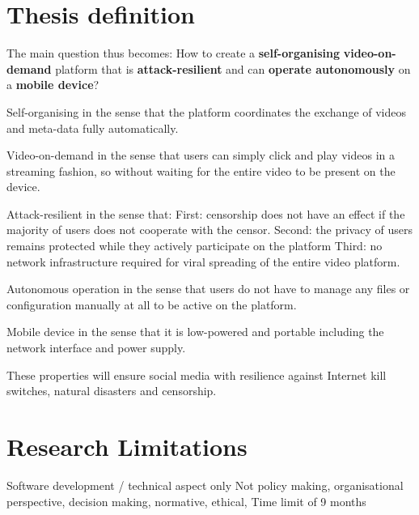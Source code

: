 \section{Thesis definition}
The main question thus becomes:
How to create a \textbf{self-organising} \textbf{video-on-demand} platform that is \textbf{attack-resilient} and can \textbf{operate autonomously} on a \textbf{mobile device}?

Self-organising in the sense that the platform coordinates the exchange of videos and meta-data fully automatically.

Video-on-demand in the sense that users can simply click and play videos in a streaming fashion, so without waiting for the entire video to be present on the device.

Attack-resilient in the sense that:
First: censorship does not have an effect if the majority of users does not cooperate with the censor.
Second: the privacy of users remains protected while they actively participate on the platform
Third: no network infrastructure required for viral spreading of the entire video platform.

Autonomous operation in the sense that users do not have to manage any files or configuration manually at all to be active on the platform.

Mobile device in the sense that it is low-powered and portable including the network interface and power supply.

These properties will ensure social media with resilience against Internet kill switches, natural disasters and censorship.



\section{Research Limitations} %
Software development / technical aspect only
Not policy making, organisational perspective, decision making, normative, ethical,
Time limit of 9 months





